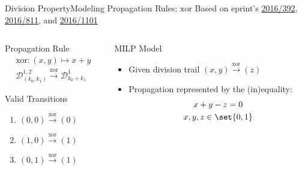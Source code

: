 \begin{frame}{Division Property}{Modeling Propagation Rules: $\mathrm{xor}$}
    \centering
    Based on eprint's \href{https://ia.cr/2016/392}{2016/392}, \href{https://ia.cr/2016/811}{2016/811}, and \href{https://ia.cr/2016/1101}{2016/1101}
    \begin{columns}
        \begin{column}{0.35\textwidth}
            \begin{block}{Propagation Rule}
            \vspace*{-10pt}
            \begin{gather*}
                \mathrm{xor} : (x,y) \mapsto x + y \\
                \mathcal{D}^{1,2}_{(k_0,k_1)} \stackrel{\mathrm{xor}}{\to} \mathcal{D}^1_{k_0+k_1}
            \end{gather*}
            \end{block}
            \begin{block}{Valid Transitions}
                \begin{enumerate}
                    \item \quad $(0,0) \stackrel{\mathrm{xor}}{\to} (0)$
                    \item \quad $(1,0) \stackrel{\mathrm{xor}}{\to} (1)$
                    \item \quad $(0,1) \stackrel{\mathrm{xor}}{\to} (1)$
                \end{enumerate}
            \end{block}
            \pause
        \end{column}
        \begin{column}{0.575\textwidth}
            \begin{block}{MILP Model}
            \begin{itemize}
                \item Given division trail $(x, y) \stackrel{\mathrm{xor}}{\to} (z)$\\[2pt]
                \item Propagation represented by the (in)equality:
                    \begin{gather*}
                        x + y - z = 0\\
                        x, y, z \in \set{0,1}
                    \end{gather*}
            \end{itemize}
            \end{block}
        \end{column}
    \end{columns}
\end{frame}

